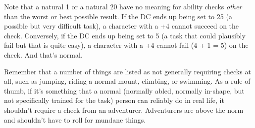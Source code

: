 \documentclass[10pt,twoside,openany,bg=none]{dndbook}
\begin{document}
Note that a natural 1 or a natural 20 have no meaning for ability checks \textit{other} than the worst or best possible result. If the DC ends up being set to 25 (a possible but very difficult task), a character with a +4 cannot succeed on the check. Conversely, if the DC ends up being set to 5 (a task that could plausibly fail but that is quite easy), a character with a +4 cannot fail (4 + 1 = 5) on the check. And that's normal.

Remember that a number of things are listed as not generally requiring checks at all, such as jumping, riding a normal mount, climbing, or swimming. As a rule of thumb, if it's something that a normal (normally abled, normally in-shape, but not specifically trained for the task) person can reliably do in real life, it shouldn't require a check from an adventurer. Adventurers are above the norm and shouldn't have to roll for mundane things.
\end{document}
